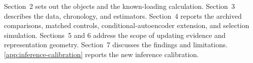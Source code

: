 Section~2 sets out the objects and the known-loading calculation. Section~3 describes the data, chronology, and estimators. Section~4 reports the archived comparisons, matched controls, conditional-autoencoder extension, and selection simulation. Sections~5 and 6 address the scope of updating evidence and representation geometry. Section~7 discusses the findings and limitations. \ref{app:inference-calibration} reports the new inference calibration.
